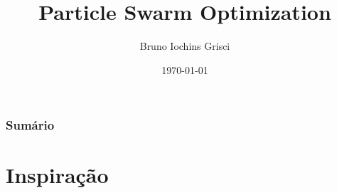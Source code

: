 \documentclass{beamer}
\title[PSO]{Particle Swarm Optimization} %
\author{Bruno Iochins Grisci} %
\institute[UFRGS] %
{
Universidade Federal do Rio Grande do Sul \\ %
\medskip
\textit{bigrisci@inf.ufrgs.br} %
}
\date{\today} %
\begin{document}
\begin{frame}
\titlepage %
\end{frame}

\begin{frame}
\frametitle{Sumário} %
\tableofcontents %
\end{frame}


\section{Inspiração} %
\end{document}
